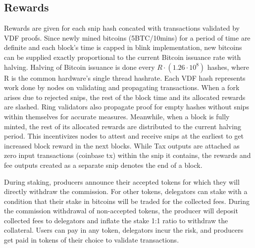 \documentclass[a4paper,10pt]{article}
\begin{document}
\subsection{Rewards}
Rewards are given for each snip hash concated with transactions validated by VDF proofs. Since newly mined bitcoins (5BTC/10mins) for a period of time are definite and each block's time is capped in blink implementation, new bitcoins can be supplied exactly proportional to the current Bitcoin issuance rate with halving. Halving of Bitcoin issuance is done every $R \cdot (1.26 \cdot 10^8)$ hashes, where R is the common hardware's single thread hashrate. Each VDF hash represents work done by nodes on validating and propagating transactions. When a fork arises due to rejected snips, the rest of the block time and its allocated rewards are slashed. Ring validators also propagate proof for empty hashes without snips within themselves for accurate measures. Meanwhile, when a block is fully minted, the rest of its allocated rewards are distributed to the current halving period. This incentivizes nodes to attest and receive snips at the earliest to get increased block reward in the next blocks. While Tax outputs are attached as zero input transactions (coinbase tx) within the snip it contains, the rewards and fee outputs created as a separate snip denotes the end of a block.

During staking, producers announce their accepted tokens for which they will directly withdraw the commission. For other tokens, delegators can stake with a condition that their stake in bitcoins will be traded for the collected fees. During the commission withdrawal of non-accepted tokens, the producer will deposit collected fees to delegators and inflate the stake 1:1 ratio to withdraw the collateral. Users can pay in any token, delegators incur the risk, and producers get paid in tokens of their choice to validate transactions.
\end{document}
